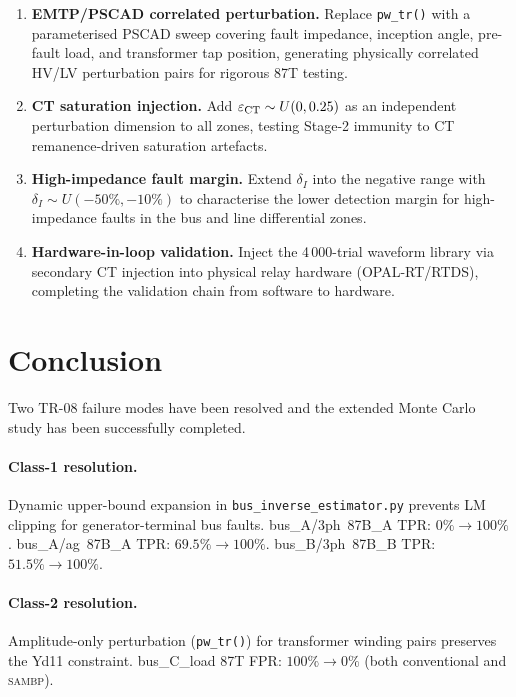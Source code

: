 \documentclass[12pt,a4paper]{article}
\newcommand{\SAMBP}{\textsc{sambp}}
\begin{document}
\begin{enumerate}
  \item \textbf{EMTP/PSCAD correlated perturbation.}
    Replace \texttt{pw\_tr()} with a parameterised PSCAD sweep covering
    fault impedance, inception angle, pre-fault load, and transformer
    tap position, generating physically correlated HV/LV perturbation
    pairs for rigorous 87T testing.

  \item \textbf{CT saturation injection.}
    Add $\varepsilon_{\rm CT} \sim U(0, 0.25)$ as an independent
    perturbation dimension to all zones, testing Stage-2 immunity to
    CT remanence-driven saturation artefacts.

  \item \textbf{High-impedance fault margin.}
    Extend $\delta_I$ into the negative range with $\delta_I \sim
    U(-50\%, -10\%)$ to characterise the lower detection margin for
    high-impedance faults in the bus and line differential zones.

  \item \textbf{Hardware-in-loop validation.}
    Inject the 4\,000-trial waveform library via secondary CT injection
    into physical relay hardware (OPAL-RT/RTDS), completing the
    validation chain from software to hardware.
\end{enumerate}

\section{Conclusion}

Two TR-08 failure modes have been resolved and the extended
Monte Carlo study has been successfully completed.

\paragraph{Class-1 resolution.}
Dynamic upper-bound expansion in \texttt{bus\_inverse\_estimator.py}
prevents LM clipping for generator-terminal bus faults.
bus\_A/3ph~87B\_A TPR: $0\% \to 100\%$.
bus\_A/ag~87B\_A TPR: $69.5\% \to 100\%$.
bus\_B/3ph~87B\_B TPR: $51.5\% \to 100\%$.

\paragraph{Class-2 resolution.}
Amplitude-only perturbation (\texttt{pw\_tr()}) for transformer winding
pairs preserves the Yd11 constraint.
bus\_C\_load 87T FPR: $100\% \to 0\%$ (both conventional and \SAMBP{}).
\end{document}
